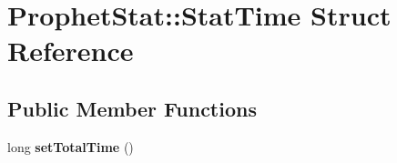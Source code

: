 \hypertarget{structProphetStat_1_1StatTime}{
\section{ProphetStat::StatTime Struct Reference}
\label{structProphetStat_1_1StatTime}
}
\subsection*{Public Member Functions}
\begin{DoxyCompactItemize}
\item 
\hypertarget{structProphetStat_1_1StatTime_a78dd2e2fb84673db1d28f210e1830257}{
long {\bfseries setTotalTime} ()}
\label{structProphetStat_1_1StatTime_a78dd2e2fb84673db1d28f210e1830257}

\end{DoxyCompactItemize}
